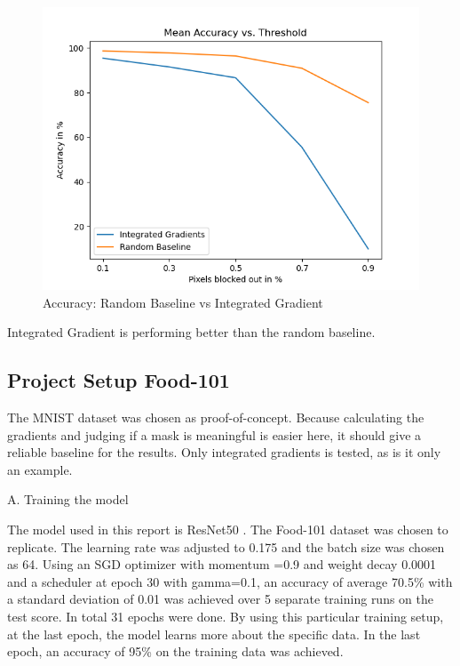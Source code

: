 \begin{figure}[h!]
	\centering
	\includegraphics[width=150mm]{figs/mean_accuracy_vs_threshold}
	\caption{Accuracy: Random Baseline vs Integrated Gradient}
	\label{fig:Accuracy}
	
\end{figure}

Integrated Gradient is performing better than the random baseline.


\subsection{Project Setup Food-101}

The MNIST dataset \cite{deng2012mnist} was chosen as proof-of-concept. Because calculating the gradients and judging if a mask is meaningful is easier here, it should give a reliable baseline for the results. Only integrated gradients is tested, as is it only an example. 

A. Training the model

The model used in this report is ResNet50 \cite{he2015deep}. The Food-101 \cite{bossard14} dataset was chosen to replicate. The learning rate was adjusted to 0.175 and the batch size was chosen as 64. Using an SGD optimizer with momentum =0.9 and weight decay 0.0001 and a scheduler at epoch 30 with gamma=0.1, an accuracy of average 70.5\% with a standard deviation of 0.01 was achieved over 5 separate training runs on the test score. In total 31 epochs were done. 
By using this particular training setup, at the last epoch, the model learns more about the specific data. In the last epoch, an accuracy of 95\% on the training data was achieved.

